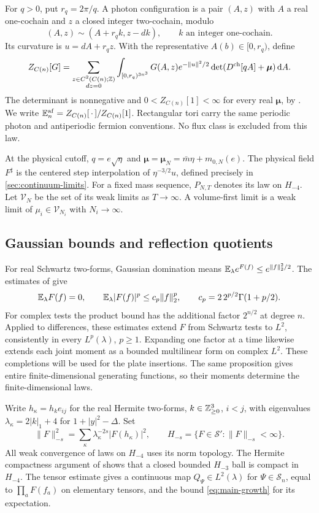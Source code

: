 For $q>0$, put $r_q=2\pi/q$. A photon configuration is a pair
$(A,z)$ with $A$ a real one-cochain and $z$ a closed integer
two-cochain, modulo
\[
 (A,z)\sim(A+r_q k,z-dk),\qquad k\text{ an integer one-cochain}.
\]
Its curvature is $u=dA+r_qz$. With the representative
$A(b)\in[0,r_q)$, define
\begin{equation}\label{eq:reg-functional}
 Z_{C(n)}[G]=
 \sum_{\substack{z\in C^2(C(n);\mathbb Z)\\dz=0}}
 \int_{[0,r_q)^{3n^3}}
 G(A,z)e^{-\|u\|^2/2}
 \det(D^{\rm ch}[qA]+\boldsymbol\mu)\,\mathrm d A.
\end{equation}
The determinant is nonnegative and $0<Z_{C(n)}[1]<\infty$ for
every real $\boldsymbol\mu$, by
\cite[Propositions~2.2--2.3]{ChamberLattice}.
We write $\mathbb E_n^{\rm af}=Z_{C(n)}[\,\cdot\,]/Z_{C(n)}[1]$.
Rectangular tori carry the same periodic photon and antiperiodic
fermion conventions. No flux class is excluded from this law.

At the physical cutoff, $q=e\sqrt\eta$ and
$\boldsymbol\mu=\boldsymbol\mu_N=\bar m\eta+m_{0,N}(e)$.
The physical field $F^\sharp$ is the centered step interpolation
of $\eta^{-3/2}u$, defined precisely in \cref{sec:continuum-limits}.
For a fixed mass sequence, $P_{N,T}$ denotes its law on $H_{-4}$.
Let $\mathcal V_N$ be the set of its weak limits as $T\to\infty$.
A volume-first limit is a weak limit of
$\mu_i\in\mathcal V_{N_i}$ with $N_i\to\infty$.

\subsection{Gaussian bounds and reflection quotients}\label{sec:probability}
For real Schwartz two-forms, Gaussian domination means
$\mathbb E_\lambda e^{F(f)}\le e^{\|f\|_2^2/2}$.
The estimates of \cite[Proposition~2.1]{ContinuumLimits} give
\[
 \mathbb E_\lambda F(f)=0,\qquad
 \mathbb E_\lambda|F(f)|^p\le c_p\|f\|_2^p,\qquad
 c_p=2\,2^{p/2}\Gamma(1+p/2).
\]
For complex tests the product bound has the additional factor
$2^{n/2}$ at degree $n$. Applied to differences, these estimates
extend $F$ from Schwartz tests to $L^2$, consistently in every
$L^p(\lambda)$, $p\ge1$. Expanding one factor at a time likewise
extends each joint moment as a bounded multilinear form on complex
$L^2$. These completions will be used for the plate insertions.
The same proposition gives entire finite-dimensional generating
functions, so their moments determine the finite-dimensional laws.

Write $h_\kappa=h_k e_{ij}$ for the real Hermite two-forms,
$k\in\mathbb Z_{\ge0}^3$, $i<j$, with eigenvalues
$\lambda_\kappa=2|k|_1+4$ for $1+|y|^2-\Delta$. Set
\[
 \|F\|_{-s}^2=\sum_\kappa\lambda_\kappa^{-2s}|F(h_\kappa)|^2,
 \qquad H_{-s}=\{F\in\mathcal S':\|F\|_{-s}<\infty\}.
\]
All weak convergence of laws on $H_{-4}$ uses its norm topology.
The Hermite compactness argument of \cite[Section~4]{ContinuumLimits}
shows that a closed bounded $H_{-3}$ ball is compact in $H_{-4}$.
The tensor estimate \cite[Proposition~6.1]{ContinuumLimits} gives a
continuous map $Q_\Psi\in L^2(\lambda)$ for $\Psi\in\mathcal S_n$,
equal to $\prod_aF(f_a)$ on elementary tensors, and the bound
\eqref{eq:main-growth} for its expectation.

